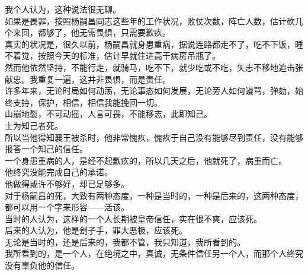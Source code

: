 \begin{multicols}{\theparacolNo}
我个人认为，这种说法很无聊。\\

如果是畏罪，按照杨嗣昌同志这些年的工作状况，败仗次数，阵亡人数，估计砍几个来回，都够了，他无需畏惧，只需要歉疚。\\

真实的状况是，很久以前，杨嗣昌就身患重病，据说连路都走不了，吃不下饭，睡不着觉，按照今天的标准，估计早就住进高干病房吊瓶了。\\

然而他依然坚持，不能行走，就骑马，吃不下，就少吃或不吃，矢志不移地追击张献忠。我重复一遍，这并非畏惧，而是责任。\\

许多年来，无论时局如何动荡，无论事态如何发展，无论旁人如何谩骂，弹劾，始终支持，保护，相信，相信我能挽回一切。\\

山崩地裂，不可动摇，人言可畏，不能移志，此即知己。\\

士为知己者死。\\

所以当他得知襄王被杀时，他非常愧疚，愧疚于自己没有能够尽到责任，没有能够报答一个知己的信任。\\

一个身患重病的人，是经不起歉疚的，所以几天之后，他就死了，病重而亡。\\

他终究没能完成自己的承诺。\\

他做得或许不够好，却已足够多。\\

对于杨嗣昌的死，大致有两种态度，一种是当时的，一种是后来的，这两种态度，都可以用一个字来形容——活该。\\

当时的人认为，这样的一个人长期被皇帝信任，实在很不爽，应该死。\\

后来的人认为，他是刽子手，罪大恶极，应该死。\\

无论是当时的，还是后来的，我都不管，我只知道，我所看到的。\\

我所看到的，是一个人，在绝境之中，真诚，无条件信任另一个人，而那个人终究没有辜负他的信任。\\
\ifnum{}
	\end{multicols}
\fi
\newpage

